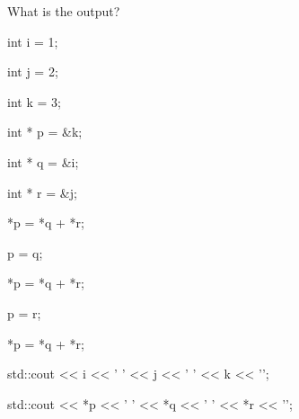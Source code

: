 
What is the output?



\begin{consolethree}[escapeinside=||]

int i = 1;

int j = 2;

int k = 3;

int * p = &k;

int * q = &i;

int * r = &j;

*p = *q + *r;

p = q;

*p = *q + *r;

p = r;

*p = *q + *r;

std::cout << i << ' ' << j << ' ' << k << '\n';

std::cout << *p << ' ' << *q << ' ' << *r << '\n'; 

\end{consolethree}

